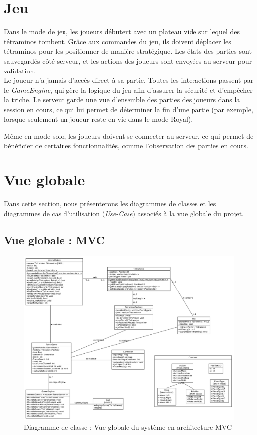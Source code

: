 \documentclass{report}
\begin{document}
\section{Jeu}

\noindent Dans le mode de jeu, les joueurs débutent avec un plateau vide sur lequel des tétraminos tombent. Grâce aux commandes du jeu, ils doivent déplacer les tétraminos pour les positionner de manière stratégique. Les états des parties sont sauvegardés côté serveur, et les actions des joueurs sont envoyées au serveur pour validation. \\

\noindent Le joueur n'a jamais d'accès direct à sa partie. Toutes les interactions passent par le \emph{GameEngine}, qui gère la logique du jeu afin d'assurer la sécurité et d'empêcher la triche. Le serveur garde une vue d'ensemble des parties des joueurs dans la session en cours, ce qui lui permet de déterminer la fin d'une partie (par exemple, lorsque seulement un joueur reste en vie dans le mode Royal).

\noindent Même en mode solo, les joueurs doivent se connecter au serveur, ce qui permet de bénéficier de certaines fonctionnalités, comme l’observation des parties en cours.

\section{Vue globale}

\noindent Dans cette section, nous présenterons les diagrammes de classes et les diagrammes de cas d’utilisation (\textit{Use-Case}) associés à la vue globale du projet.

\subsection{Vue globale : MVC}

\vspace{-1em}

\begin{figure}[H]
    \centering
    \includegraphics[width=\textwidth, keepaspectratio]{src/cdg_global.png}
    \caption{Diagramme de classe : Vue globale du système en architecture MVC}
    \label{fig:class_global_mvc}
\end{figure}
\end{document}
